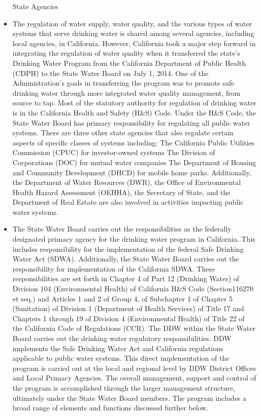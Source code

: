 \begin{itemize}
State Agencies
\item The regulation of water supply, water quality, and the various types of water systems that serve drinking water is shared among several agencies, including local agencies, in California. However, California took a major step forward in integrating the regulation of water quality when it transferred the state’s Drinking Water Program from the California Department of Public Health (CDPH) to the State Water Board on July 1, 2014. One of the Administration’s goals in transferring the program was to promote safe drinking water through more integrated water quality management, from source to tap.
Most of the statutory authority for regulation of drinking water is in the California Health and Safety (H\&S) Code. Under the H\&S Code, the State Water Board has primary responsibility for regulating all public water systems. There are three other state agencies that also regulate certain aspects of specific classes of systems including:
The California Public Utilities Commission (CPUC) for investor-owned systems
The Division of Corporations (DOC) for mutual water companies
The Department of Housing and Community Development (DHCD) for mobile home parks.
Additionally, the Department of Water Resources (DWR), the Office of Environmental Health Hazard Assessment (OEHHA), the Secretary of State, and the Department of Real Estate are also involved in activities impacting public water systems.
\item The State Water Board carries out the responsibilities as the federally designated primacy agency for the drinking water program in California. This includes responsibility for the implementation of the federal Safe Drinking Water Act (SDWA). Additionally, the State Water Board carries out the responsibility for implementation of the California SDWA. These responsibilities are set forth in Chapter 4 of Part 12 (Drinking Water) of Division 104 (Environmental Health) of California H\&S Code (Section116270 et seq.) and Articles 1 and 2 of Group 4, of Subchapter 1 of Chapter 5 (Sanitation) of Division 1 (Department of Health Services) of Title 17 and Chapters 1 through 19 of Division 4 (Environmental Health) of Title 22 of the California Code of Regulations (CCR). The DDW within the State Water Board carries out the drinking water regulatory responsibilities.
DDW implements the Safe Drinking Water Act and California regulations applicable to public water systems. This direct implementation of the program is carried out at the local and regional level by DDW District Offices and Local Primacy Agencies. The overall management, support and control of the program is accomplished through the larger management structure, ultimately under the State Water Board members. The program includes a broad range of elements and functions discussed further below.

\end{itemize}
